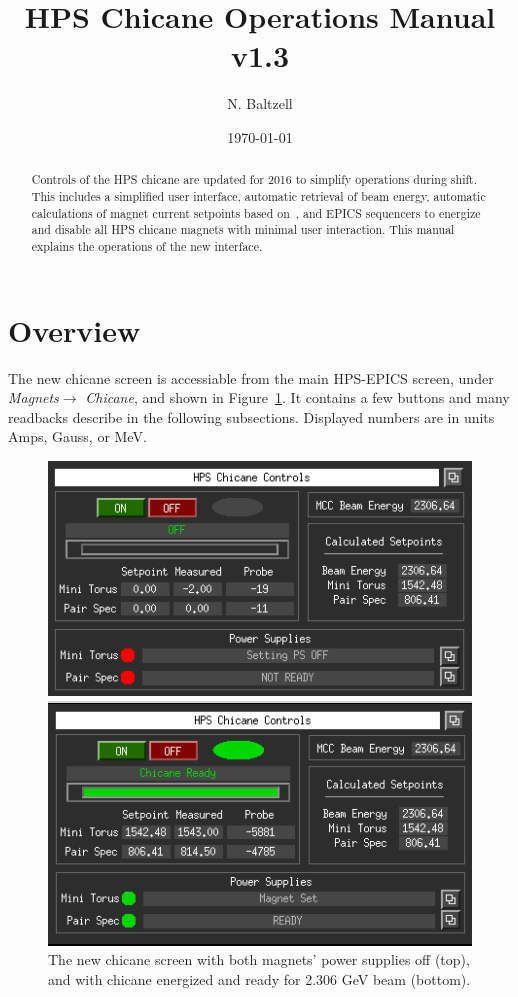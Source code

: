 \documentclass[amsmath,amssymb,notitlepage,11pt]{revtex4-1}
\begin{document}
\title{HPS Chicane Operations Manual v1.3}
\author{N. Baltzell}
\date{\today}
\begin{abstract}
    Controls of the HPS chicane are updated for 2016 to simplify operations during shift.  This includes a simplified user interface, automatic retrieval of beam energy, automatic calculations of magnet current setpoints based on~\cite{chicaneSettings}, and EPICS sequencers to energize and disable all HPS chicane magnets with minimal user interaction.  This manual explains the operations of the new interface. 
\end{abstract}

\maketitle
\tableofcontents
\newpage

\section{Overview}
The new chicane screen is accessiable from the main HPS-EPICS screen, under {\em Magnets}$ \to$ {\em Chicane}, and shown in Figure~\ref{fig:guiChicaneOff}.  It contains a few buttons and many readbacks describe in the following subsections.  Displayed numbers are in units Amps, Gauss, or MeV. 
\begin{figure}[htbp]
    \centering\includegraphics[width=12cm]{pics/guiOFF}
    
    \centering\includegraphics[width=12cm]{pics/guiON}
    \caption{The new chicane screen with both magnets' power supplies off (top), and with chicane energized and ready for 2.306 GeV beam (bottom).\label{fig:guiChicaneOff}}
\end{figure}
\end{document}
